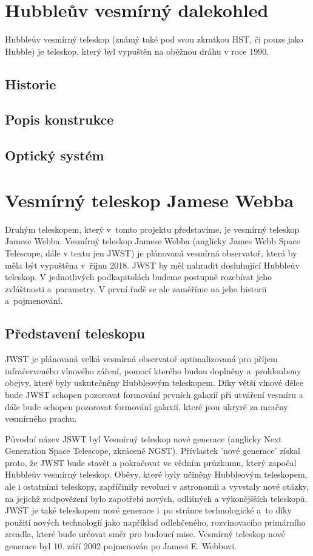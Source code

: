\documentclass[a4paper,11pt]{article}
\begin{document}
\section{Hubbleův vesmírný dalekohled}
Hubbleův vesmírný teleskop (známý také pod svou zkratkou HST, či pouze jako Hubble) je teleskop, který byl vypuštěn na oběžnou dráhu v roce 1990\cite{nasaHubbleChronology}. 
\subsection{Historie}
\subsection{Popis konstrukce}
\subsection{Optický systém}


\section{Vesmírný teleskop Jamese Webba}

Druhým teleskopem, který v~tomto projektu představíme, je vesmírný teleskop Jamese Webba. Vesmírný teleskop Jamese Webba (anglicky James Webb Space Telescope, dále v textu jen JWST) je plánovaná vesmírná observatoř, která by měla být vypuštěna v~říjnu 2018. JWST by měl nahradit dosluhující Hubbleův teleskop. V jednotlivých podkapitolách budeme postupně rozebírat jeho zvláštnosti a~parametry. V první řadě se ale zaměříme na jeho historii a~pojmenování.

\subsection{Představení teleskopu}
JWST je plánovaná velká vesmírná observatoř optimalizovaná pro příjem infračerveného vlnového záření, pomocí kterého budou doplněny a~prohloubeny obejvy, které byly uskutečněny Hubbleovým teleskopem.
Díky větší vlnové délce bude JWST schopen pozorovat formování prvních galaxií při utváření vesmíru a dále bude schopen pozorovat formování galaxií, které jsou ukryré za mračny vesmírného prachu.

Původní název JSWT byl Vesmírný teleskop nové generace (anglicky Next Generation Space Telescope, zkráceně NGST). Přívlastek 'nové generace' získal proto, že JWST bude stavět a pokračovat ve vědním průzkumu, který započal Hubbleův vesmírný teleskop. Oběvy, které byly učiněny Hubbleovým teleskopem, ale i ostatními teleskopy, zapříčinily revoluci v astronomii a vyvstaly nové otázky, na jejichž zodpovězení bylo zapotřebí nových, odlišných a výkonějšších teleskopů. 
JWST je také teleskopem nové generace i~po stránce technologické a~to díky použití nových technologií jako například odlehčeného, rozvinovacího primárního zrcadla, které bude určovat směr pro budoucí mise.
Vesmírný teleskop nové generace byl 10. září 2002 pojmenován po Jamesi E. Webbovi.
 
\end{document}
